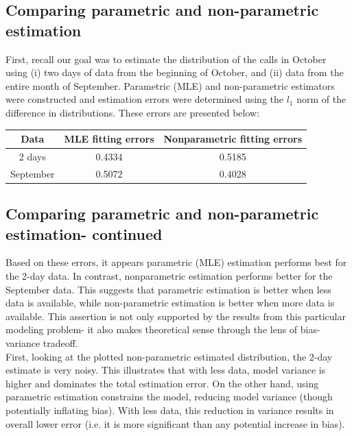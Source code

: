 \documentclass[paper=a4, fontsize=11pt]{scrartcl} %
\numberwithin{equation}{section} %
\numberwithin{figure}{section} %
\numberwithin{table}{section} %
\begin{document}
\subsection{Comparing parametric and non-parametric estimation}

First, recall our goal was to estimate the distribution of the calls in October using (i) two days of data from the beginning of October, and (ii) data from the entire month of September. Parametric (MLE) and non-parametric estimators were constructed and estimation errors were determined using the $l_1$ norm of the difference in distributions. These errors are presented below:
\begin{center}
   \begin{tabular}{ | c | c | c | }
   \hline
   \textbf{Data} & \textbf{MLE fitting errors} & \textbf{Nonparametric fitting errors} \\ \hline
   2 days & 0.4334 & 0.5185 \\ \hline
   September & 0.5072 & 0.4028 \\ \hline
   \end{tabular}
\end{center}
      
\subsection{Comparing parametric and non-parametric estimation- continued}

Based on these errors, it appears parametric (MLE) estimation performs best for the 2-day data. In contrast, nonparametric estimation performs better for the September data. This suggests that parametric estimation is better when less data is available, while non-parametric estimation is better when more data is available. This assertion is not only supported by the results from this particular modeling problem- it also makes theoretical sense through the lens of bias-variance tradeoff.\\

First, looking at the plotted non-parametric estimated distribution, the 2-day estimate is very noisy. This illustrates that with less data, model variance is higher and dominates the total estimation error. On the other hand, using parametric estimation constrains the model, reducing model variance (though potentially inflating bias). With less data, this reduction in variance results in overall lower error (i.e. it is more significant than any potential increase in bias).\\
\end{document}

